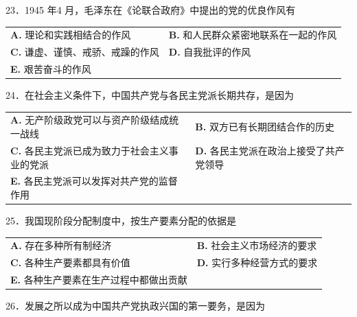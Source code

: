 \documentclass[UTF8,11pt]{ctexart}
\begin{document}
23．1945 年4 月，毛泽东在《论联合政府》中提出的党的优良作风有


\begin{center}\begin{tabular}{>{\raggedright\arraybackslash}p{\dimexpr(\linewidth-4\tabcolsep)/2\relax}>{\raggedright\arraybackslash}p{\dimexpr(\linewidth-4\tabcolsep)/2\relax}}
\textbf{A.} 理论和实践相结合的作风 & \textbf{B.} 和人民群众紧密地联系在一起的作风\\[.35em]
\textbf{C.} 谦虚、谨慎、戒骄、戒躁的作风 & \textbf{D.} 自我批评的作风\\[.35em]
\textbf{E.} 艰苦奋斗的作风 & \\[.35em]\end{tabular}\end{center}

24．在社会主义条件下，中国共产党与各民主党派长期共存，是因为


\begin{center}\begin{tabular}{>{\raggedright\arraybackslash}p{\dimexpr(\linewidth-4\tabcolsep)/2\relax}>{\raggedright\arraybackslash}p{\dimexpr(\linewidth-4\tabcolsep)/2\relax}}
\textbf{A.} 无产阶级政党可以与资产阶级结成统一战线 & \textbf{B.} 双方已有长期团结合作的历史\\[.35em]
\textbf{C.} 各民主党派已成为致力于社会主义事业的党派 & \textbf{D.} 各民主党派在政治上接受了共产党领导\\[.35em]
\textbf{E.} 各民主党派可以发挥对共产党的监督作用 & \\[.35em]\end{tabular}\end{center}

25．我国现阶段分配制度中，按生产要素分配的依据是


\begin{center}\begin{tabular}{>{\raggedright\arraybackslash}p{\dimexpr(\linewidth-4\tabcolsep)/2\relax}>{\raggedright\arraybackslash}p{\dimexpr(\linewidth-4\tabcolsep)/2\relax}}
\textbf{A.} 存在多种所有制经济 & \textbf{B.} 社会主义市场经济的要求\\[.35em]
\textbf{C.} 各种生产要素都具有价值 & \textbf{D.} 实行多种经营方式的要求\\[.35em]
\textbf{E.} 各种生产要素在生产过程中都做出贡献 & \\[.35em]\end{tabular}\end{center}

26．发展之所以成为中国共产党执政兴国的第一要务，是因为
\end{document}
